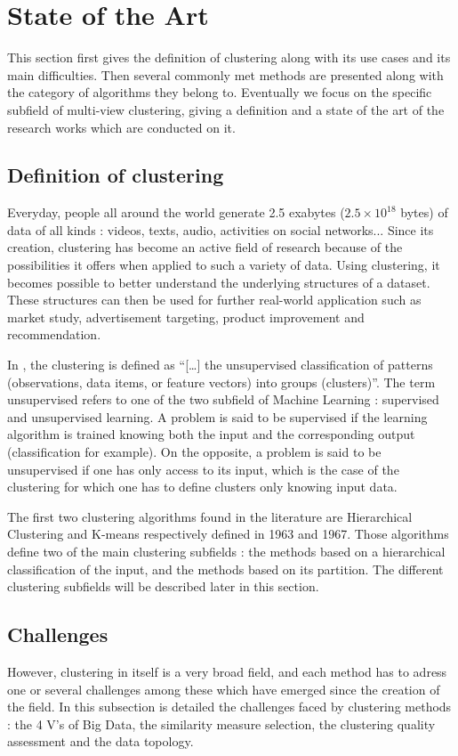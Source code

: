 \documentclass[a4paper]{report}
\begin{document}
\chapter{State of the Art}
This section first gives the definition of clustering along with its use cases and its main difficulties. Then several commonly met methods are presented along with the category of algorithms they belong to. Eventually we focus on the specific subfield of multi-view clustering, giving a definition and a state of the art of the research works which are conducted on it.

    \section{Definition of clustering}
    Everyday, people all around the world generate 2.5 exabytes ($2.5 \times 10^{18}$ bytes) of data of all kinds : videos, texts, audio, activities on social networks... Since its creation, clustering has become an active field of research because of the possibilities it offers when applied to such a variety of data. Using clustering, it becomes possible to better understand the underlying structures of a dataset. These structures can then be used for further real-world application such as market study, advertisement targeting, product improvement and recommendation.

    In \cite{jain1999data}, the clustering is defined as ``[\ldots] the unsupervised classification of patterns (observations, data items, or feature vectors) into groups (clusters)''. The term unsupervised refers to one of the two subfield of Machine Learning : supervised and unsupervised learning. A problem is said to be supervised if the learning algorithm is trained knowing both the input and the corresponding output (classification for example). On the opposite, a problem is said to be unsupervised if one has only access to its input, which is the case of the clustering for which one has to define clusters only knowing input data.  

    The first two clustering algorithms found in the literature are Hierarchical Clustering \cite{ward1963hierarchical} and K-means \cite{macqueen1967some} respectively defined in 1963 and 1967. Those algorithms define two of the main clustering subfields : the methods based on a hierarchical classification of the input, and the methods based on its partition. The different clustering subfields will be described later in this section.

    \section{Challenges}
    However, clustering in itself is a very broad field, and each method has to adress one or several challenges among these which have emerged since the creation of the field. In this subsection is detailed the challenges faced by clustering methods : the 4 V's of Big Data, the similarity measure selection, the clustering quality assessment and the data topology.
    
\end{document}
